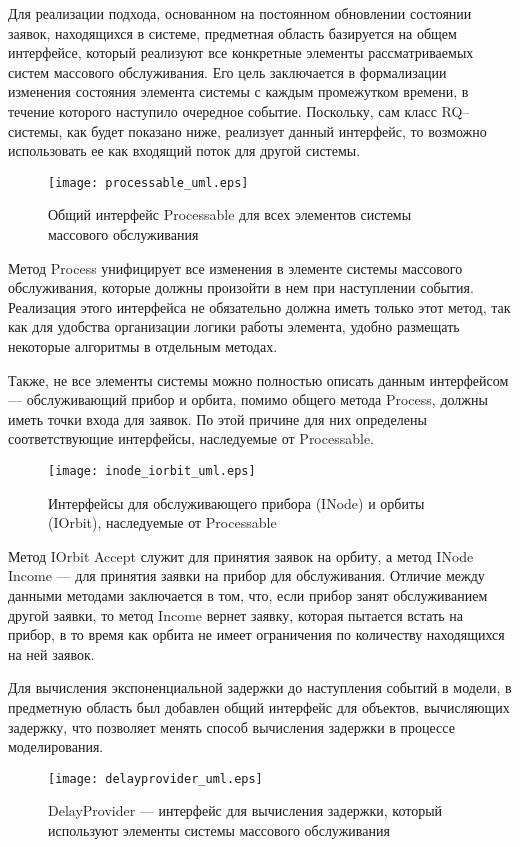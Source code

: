 Для реализации подхода, основанном на постоянном обновлении состоянии заявок, находящихся в системе, предметная область базируется на общем интерфейсе, который реализуют все конкретные элементы рассматриваемых систем массового обслуживания. Его цель заключается в формализации изменения состояния элемента системы с каждым промежутком времени, в течение которого наступило очередное событие. Поскольку, сам класс RQ--системы, как будет показано ниже, реализует данный интерфейс, то возможно использовать ее как входящий поток для другой системы.
\begin{figure}[H]
	\centering
	\texttt{[image: processable\_uml.eps]}
	\caption{Общий интерфейс Processable для всех элементов системы массового обслуживания}
	\label{processable_uml}
\end{figure}
Метод Process унифицирует все изменения в элементе системы массового обслуживания, которые должны произойти в нем при наступлении события. Реализация этого интерфейса не обязательно должна иметь только этот метод, так как для удобства организации логики работы элемента, удобно размещать некоторые алгоритмы в отдельным методах.

Также, не все элементы системы можно полностью описать данным интерфейсом --- обслуживающий прибор и орбита, помимо общего метода Process, должны иметь точки входа для заявок. По этой причине для них определены соответствующие интерфейсы, наследуемые от Processable.
\begin{figure}[H]
	\centering
	\texttt{[image: inode\_iorbit\_uml.eps]}
	\caption{Интерфейсы для обслуживающего прибора (INode) и орбиты (IOrbit), наследуемые от Processable}
	\label{inode_iorbit_uml}
\end{figure}
Метод IOrbit Accept служит для принятия заявок на орбиту, а метод INode Income --- для принятия заявки на прибор для обслуживания. Отличие между данными методами заключается в том, что, если прибор занят обслуживанием другой заявки, то метод Income вернет заявку, которая пытается встать на прибор, в то время как орбита не имеет ограничения по количеству находящихся на ней заявок.

Для вычисления экспоненциальной задержки до наступления событий в модели, в предметную область был добавлен общий интерфейс для объектов, вычисляющих задержку, что позволяет менять способ вычисления задержки в процессе моделирования.
\begin{figure}[H]
	\centering
	\texttt{[image: delayprovider\_uml.eps]}
	\caption{DelayProvider --- интерфейс для вычисления задержки, который используют элементы системы массового обслуживания}
	\label{delayprovider_uml}
\end{figure}

